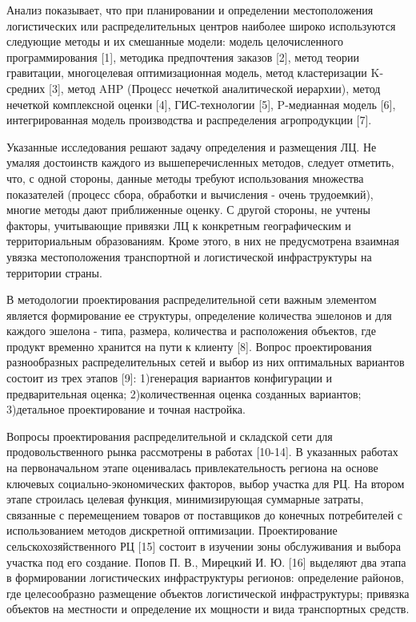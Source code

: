 Анализ показывает, что при планировании и определении местоположения
логистических или распределительных центров наиболее широко используются
следующие методы и их смешанные модели: модель целочисленного
программирования {[}1{]}, методика предпочтения заказов {[}2{]}, метод
теории гравитации, многоцелевая оптимизационная модель, метод
кластеризации K-средних {[}3{]}, метод AHP (Процесс нечеткой
аналитической иерархии), метод нечеткой комплексной оценки {[}4{]},
ГИС-технологии {[}5{]}, P-медианная модель {[}6{]}, интегрированная
модель производства и распределения агропродукции {[}7{]}.

Указанные исследования решают задачу определения и размещения ЛЦ. Не
умаляя достоинств каждого из вышеперечисленных методов, следует
отметить, что, с одной стороны, данные методы требуют использования
множества показателей (процесс сбора, обработки и вычисления - очень
трудоемкий), многие методы дают приближенные оценку. С другой стороны,
не учтены факторы, учитывающие привязки ЛЦ к конкретным географическим и
территориальным образованиям. Кроме этого, в них не предусмотрена
взаимная увязка местоположения транспортной и логистической
инфраструктуры на территории страны.

В методологии проектирования распределительной сети важным элементом
является формирование ее структуры, определение количества эшелонов и
для каждого эшелона - типа, размера, количества и расположения объектов,
где продукт временно хранится на пути к клиенту {[}8{]}. Вопрос
проектирования разнообразных распределительных сетей и выбор из них
оптимальных вариантов состоит из трех этапов {[}9{]}: 1)генерация
вариантов конфигурации и предварительная оценка; 2)количественная оценка
созданных вариантов; 3)детальное проектирование и точная настройка.

Вопросы проектирования распределительной и складской сети для
продовольственного рынка рассмотрены в работах {[}10-14{]}. В указанных
работах на первоначальном этапе оценивалась привлекательность региона на
основе ключевых социально-экономических факторов, выбор участка для РЦ.
На втором этапе строилась целевая функция, минимизирующая суммарные
затраты, связанные с перемещением товаров от поставщиков до конечных
потребителей с использованием методов дискретной оптимизации.
Проектирование сельскохозяйственного РЦ {[}15{]} состоит в изучении зоны
обслуживания и выбора участка под его создание. Попов П. В., Мирецкий И.
Ю. {[}16{]} выделяют два этапа в формировании логистических
инфраструктуры регионов: определение районов, где целесообразно
размещение объектов логистической инфраструктуры; привязка объектов на
местности и определение их мощности и вида транспортных средств.

